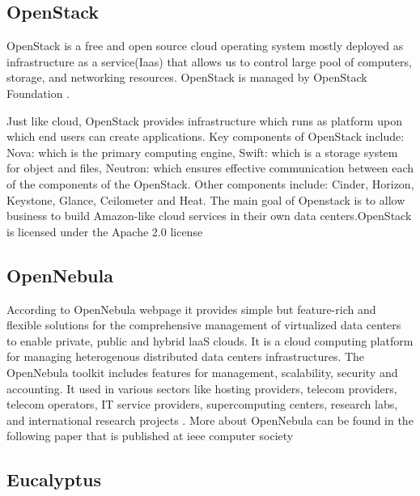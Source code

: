 \subsection{OpenStack}
 
     OpenStack \cite{www-OpenStack.org} is a free and open source cloud operating 
     system mostly deployed as infrastructure as a service(Iaas) that allows 
     us to control large pool of computers, storage, and networking resources.
     OpenStack is managed by OpenStack Foundation \cite{www-OpenStack-Found}. 
     
     Just like cloud, OpenStack provides infrastructure which runs as platform 
     upon which end users can create applications. Key components of OpenStack 
     include: Nova: which is the primary computing engine, Swift: which is a 
     storage system for object and files, Neutron: which ensures effective 
     communication between each of the components of the OpenStack. Other   
     components include: Cinder, Horizon, Keystone, Glance, Ceilometer and 
     Heat. The main goal of Openstack is to allow business to build 
     Amazon-like cloud services in their own data centers.OpenStack is 
     licensed under the Apache 2.0 license \cite{www-apache-license} 
	
\subsection{OpenNebula}

     According to OpenNebula webpage \cite{www-opennebula-org} it
     provides simple but feature-rich and flexible solutions for the
     comprehensive management of virtualized data centers to enable
     private, public and hybrid laaS clouds. It is a cloud computing
     platform for managing heterogenous distributed data centers
     infrastructures. The OpenNebula toolkit includes features for
     management, scalability, security and accounting. It used in
     various sectors like hosting providers, telecom providers,
     telecom operators, IT service providers, supercomputing centers,
     research labs, and international research projects
     \cite{www-opennebula-wiki}. More about OpenNebula can be found
     in the following paper that is published at ieee computer society
     \cite{paper-opennebula}
     
\subsection{Eucalyptus}


